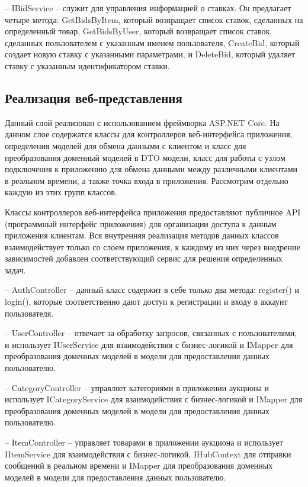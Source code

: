 – IBidService – служит для управления информацией о ставках. 
Он предлагает четыре метода: GetBidsByItem, 
который возвращает список ставок, сделанных на определенный товар, 
GetBidsByUser, который возвращает список ставок, сделанных пользователем с указанным именем пользователя, 
CreateBid, который создает новую ставку с указанными параметрами, и DeleteBid, 
который удаляет ставку с указанным идентификатором ставки.


\subsection{Реализация  веб-представления}
Данный слой реализован с использованием фреймворка ASP.NET Core. 
На данном слое содержатся классы для контроллеров веб-интерфейса приложения, 
определения моделей для обмена данными с клиентом и класс для преобразования доменный моделей в DTO модели, 
класс для работы с узлом подключения к приложению для обмена данными между различными клиентами в реальном времени, 
а также точка входа в приложения. Рассмотрим отдельно каждую из этих групп классов.

Классы контроллеров веб-интерфейса приложения предоставляют публичное API (программный интерфейс приложения) 
для организации доступа к данным приложения клиентам. 
Вся внутренняя реализация методов данных классов взаимодействует только со слоем приложения, 
к каждому из них через внедрение зависимостей добавлен соответствующий сервис для решения 
определенных задач.


– AuthController – данный класс содержит в себе только два метода: 
register() и login(), которые соответственно дают доступ к регистрации и входу в аккаунт пользователя.

– UserController – отвечает за обработку запросов, связанных с пользователями, 
и использует IUserService для взаимодействия с бизнес-логикой и 
IMapper для преобразования доменных моделей в модели для предоставления данных пользователю. 

– CategoryController – управляет категориями в приложении аукциона и использует ICategoryService для взаимодействия с бизнес-логикой 
и IMapper для преобразования доменных моделей в модели для предоставления данных пользователю.

– ItemController – управляет товарами в приложении аукциона и использует IItemService для взаимодействия с бизнес-логикой, 
IHubContext для отправки сообщений в реальном времени и IMapper для преобразования доменных моделей в модели для предоставления данных пользователю.


